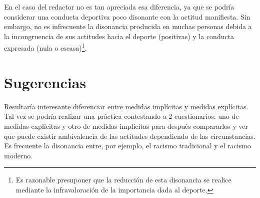 \documentclass[palatino,nochap]{apuntesURJC}
\begin{document}
\label{final}
%
En el caso del redactor no es tan apreciada esa diferencia, ya que se podría considerar una conducta deportiva poco disonante con la actitud manifiesta.
%
Sin embargo, no es infrecuente la disonancia producida en muchas personas debida a la incongruencia de sus actitudes hacia el deporte (positivas) y la conducta expresada (nula o escasa)\footnote{Es razonable presuponer que la reducción de esta disonancia se realice mediante la infravaloración de la importancia dada al deporte.}.


\section{Sugerencias}

Resultaría interesante diferenciar entre medidas implícitas y medidas explícitas.
%
Tal vez se podría realizar una práctica contestando a 2 cuestionarios: uno de medidas explícitas y otro de medidas implícitas para después compararlos y ver que puede existir ambivalencia de las actitudes dependiendo de las circunstancias.
%
Es frecuente la disonancia entre, por ejemplo, el racismo tradicional y el racismo moderno.




  
\label{bibliografia}

\printindex
\end{document}
